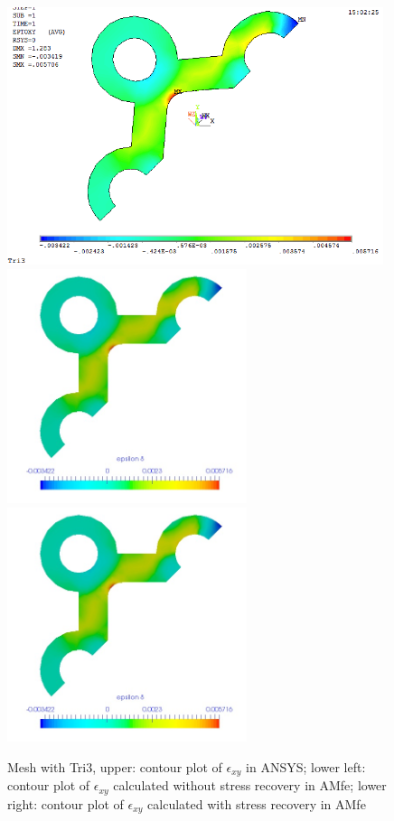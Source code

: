 \begin{figure}[htbp]
	\begin{center}
		\includegraphics[width=11cm,clip]{TTri3_Exy.png} 
		\includegraphics[width=7cm,clip]{TTri3_Exy_PD.png} 		
		\includegraphics[width=7cm,clip]{TTri3_Exy_P.png} 		
		\caption{Mesh with Tri3, upper: contour plot of $\epsilon_{xy}$ in ANSYS; lower left: contour plot of $\epsilon_{xy}$ calculated without stress recovery in AMfe; lower right: contour plot of $\epsilon_{xy}$ calculated with stress recovery in AMfe} \label{fig: Tri3_Exy}
	\end{center}
\end{figure}
\clearpage 

